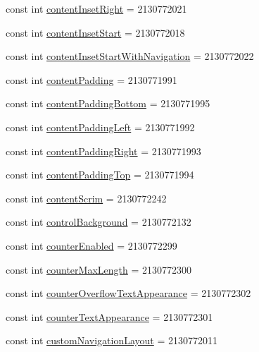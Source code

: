 \begin{CompactItemize}
const int \hyperlink{class__2doo_1_1_droid_1_1_resource_1_1_attribute_7f37ba70c1d389d89ade357d38e64f2b}{contentInsetRight} = 2130772021
\item 
const int \hyperlink{class__2doo_1_1_droid_1_1_resource_1_1_attribute_f88916603a82486ed787ac1e1e5f0b56}{contentInsetStart} = 2130772018
\item 
const int \hyperlink{class__2doo_1_1_droid_1_1_resource_1_1_attribute_abb83291e3b74293e0d9d15a5ee5493d}{contentInsetStartWithNavigation} = 2130772022
\item 
const int \hyperlink{class__2doo_1_1_droid_1_1_resource_1_1_attribute_127e9230bbf8023fa7d01a3c0937bfb6}{contentPadding} = 2130771991
\item 
const int \hyperlink{class__2doo_1_1_droid_1_1_resource_1_1_attribute_ac6c1c025432f02f9952e9c6d2e069ef}{contentPaddingBottom} = 2130771995
\item 
const int \hyperlink{class__2doo_1_1_droid_1_1_resource_1_1_attribute_ff70a837fe64bdcfd66effcf494b41ec}{contentPaddingLeft} = 2130771992
\item 
const int \hyperlink{class__2doo_1_1_droid_1_1_resource_1_1_attribute_99e3bfe8921ac6159d234de58a4ac9a7}{contentPaddingRight} = 2130771993
\item 
const int \hyperlink{class__2doo_1_1_droid_1_1_resource_1_1_attribute_740ad38de42f791c97164b3be636d259}{contentPaddingTop} = 2130771994
\item 
const int \hyperlink{class__2doo_1_1_droid_1_1_resource_1_1_attribute_78b6ff409e7f5f53ad080e2140f97d20}{contentScrim} = 2130772242
\item 
const int \hyperlink{class__2doo_1_1_droid_1_1_resource_1_1_attribute_ef4a89660af32b41ae07e0ff7b815b04}{controlBackground} = 2130772132
\item 
const int \hyperlink{class__2doo_1_1_droid_1_1_resource_1_1_attribute_5c2eef4032ea2f604bb2d12e28f3d83d}{counterEnabled} = 2130772299
\item 
const int \hyperlink{class__2doo_1_1_droid_1_1_resource_1_1_attribute_27b35f8b8b1cb168cc725ed149c0feea}{counterMaxLength} = 2130772300
\item 
const int \hyperlink{class__2doo_1_1_droid_1_1_resource_1_1_attribute_f6ba4afd9ef41821359896a45142a7a1}{counterOverflowTextAppearance} = 2130772302
\item 
const int \hyperlink{class__2doo_1_1_droid_1_1_resource_1_1_attribute_8812b7fecfaff37fc17e1e33e3cd6270}{counterTextAppearance} = 2130772301
\item 
const int \hyperlink{class__2doo_1_1_droid_1_1_resource_1_1_attribute_b554ed093df09f360bb8e35ebfb66315}{customNavigationLayout} = 2130772011

\end{CompactItemize}
